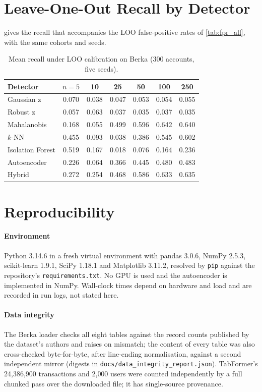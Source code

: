 \section{Leave-One-Out Recall by Detector}\label{app:recall}

 gives the recall that accompanies the LOO false-positive rates of \cref{tab:fpr_all}, with the same cohorts and seeds.

\begin{table}[!t]
\caption{Mean recall under LOO calibration on Berka (300 accounts, five seeds).}
\label{tab:recall}
\centering\footnotesize\setlength{\tabcolsep}{3pt}
\begin{tabular}{l cccccc}
\toprule
Detector & $n=5$ & 10 & 25 & 50 & 100 & 250 \\
\midrule
Gaussian z       & 0.070 & 0.038 & 0.047 & 0.053 & 0.054 & 0.055 \\
Robust z         & 0.057 & 0.063 & 0.037 & 0.035 & 0.037 & 0.035 \\
Mahalanobis      & 0.168 & 0.055 & 0.499 & 0.596 & 0.642 & 0.640 \\
$k$-NN           & 0.455 & 0.093 & 0.038 & 0.386 & 0.545 & 0.602 \\
Isolation Forest & 0.519 & 0.167 & 0.018 & 0.076 & 0.164 & 0.236 \\
Autoencoder      & 0.226 & 0.064 & 0.366 & 0.445 & 0.480 & 0.483 \\
Hybrid           & 0.272 & 0.254 & 0.468 & 0.586 & 0.633 & 0.635 \\
\bottomrule
\end{tabular}
\end{table}

\section{Reproducibility}\label{app:repro}

\paragraph{Environment}
Python 3.14.6 in a fresh virtual environment with pandas 3.0.6, NumPy 2.5.3, scikit-learn 1.9.1, SciPy 1.18.1 and Matplotlib 3.11.2, resolved by \texttt{pip} against the repository's \texttt{requirements.txt}. No GPU is used and the autoencoder is implemented in NumPy. Wall-clock times depend on hardware and load and are recorded in run logs, not stated here.

\paragraph{Data integrity}
The Berka loader checks all eight tables against the record counts published by the dataset's authors and raises on mismatch; the content of every table was also cross-checked byte-for-byte, after line-ending normalisation, against a second independent mirror (digests in \texttt{docs/data\_integrity\_report.json}). TabFormer's 24{,}386{,}900 transactions and 2{,}000 users were counted independently by a full chunked pass over the downloaded file; it has single-source provenance.

